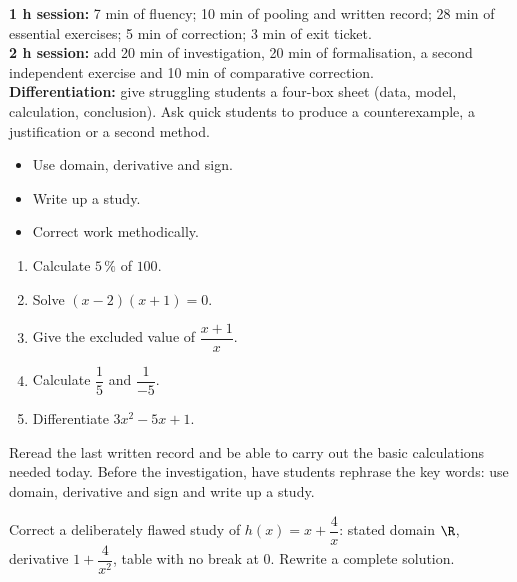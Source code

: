 \ifprof
\begin{methode}
\textbf{1 h session:} 7 min of fluency; 10 min of pooling and written record; 28 min of essential exercises; 5 min of correction; 3 min of exit ticket.\\
\textbf{2 h session:} add 20 min of investigation, 20 min of formalisation, a second independent exercise and 10 min of comparative correction.\\
\textbf{Differentiation:} give struggling students a four-box sheet (data, model, calculation, conclusion). Ask quick students to produce a counterexample, a justification or a second method.
\end{methode}
\fi
{}
\begin{objectifs}\begin{itemize}\item Use domain, derivative and sign.\item Write up a study.\item Correct work methodically.\end{itemize}\end{objectifs}
\begin{automatismes}\begin{enumerate}\item Calculate $5\,\%$ of $100$. \item Solve $(x-2)(x+1)=0$. \item Give the excluded value of $\dfrac{x+1}{x}$. \item Calculate $\dfrac1{5}$ and $\dfrac1{-5}$. \item Differentiate $3x^2-5x+1$. \end{enumerate}\end{automatismes}
\begin{prerequis}Reread the last written record and be able to carry out the basic calculations needed today. Before the investigation, have students rephrase the key words: use domain, derivative and sign and write up a study.\end{prerequis}

\begin{activite}
Correct a deliberately flawed study of $h(x)=x+\dfrac4x$: stated domain $\R$, derivative $1+\dfrac4{x^2}$, table with no break at $0$. Rewrite a complete solution.

\end{activite}

